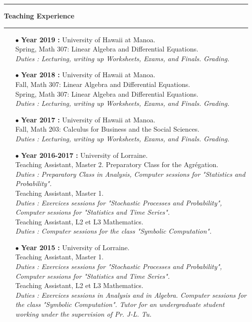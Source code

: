 \documentclass[a4paper,11pt]{article}
\newcommand{\titre}[1]{%
	\begin{center}
	\bigskip
	\rule{\textwidth}{1pt}
	\par\vspace{0.1cm}
        \textbf{\large #1}
	\par\rule{\textwidth}{1pt}
	\end{center}
	\bigskip
	}
\begin{document}
\titre{Teaching Experience}

\begin{itemize}

\item[$\bullet$] \textbf{ Year 2019 :} University of Hawaii at Manoa.\\
					Spring, Math 307: Linear Algebra and Differential Equations.\\
					\textit{Duties : Lecturing, writing up Worksheets, Exams, and Finals. Grading.}\\

\item[$\bullet$] \textbf{ Year 2018 :} University of Hawaii at Manoa.\\
					Fall, Math 307: Linear Algebra and Differential Equations.\\
					Spring, Math 307: Linear Algebra and Differential Equations.\\
					\textit{Duties : Lecturing, writing up Worksheets, Exams, and Finals. Grading.}\\

\item[$\bullet$] \textbf{ Year 2017 :} University of Hawaii at Manoa.\\
					Fall, Math 203: Calculus for Business and the Social Sciences.\\
					\textit{Duties : Lecturing, writing up Worksheets, Exams, and Finals. Grading.}\\

\item[$\bullet$] \textbf{ Year 2016-2017 :} University of Lorraine.\\
					Teaching Assistant, Master 2. Preparatory Class for the Agrégation.\\
					\textit{Duties : Preparatory Class in Analysis, Computer sessions for "Statistics and Probability".}\\
					Teaching Assistant, Master 1.\\
					\textit{Duties : Exercices sessions for "Stochastic Processes and Probability", Computer sessions for "Statistics and Time Series".}\\
					Teaching Assistant, L2 et L3 Mathematics. \\
					\textit{Duties : Computer sessions for the class "Symbolic Computation".}\\   
\item[$\bullet$] \textbf{ Year 2015 :} University of Lorraine.\\
					Teaching Assistant, Master 1.\\
					\textit{Duties : Exercices sessions for "Stochastic Processes and Probability", Computer sessions for "Statistics and Time Series".}\\
					Teaching Assistant, L2 et L3 Mathematics. \\
					\textit{Duties : Exercices sessions in Analysis and in Algebra. Computer sessions for the class "Symbolic Computation". Tutor for an undergraduate student working under the supervision of Pr. J-L. Tu.}\\   
					

\end{itemize}
\end{document}
